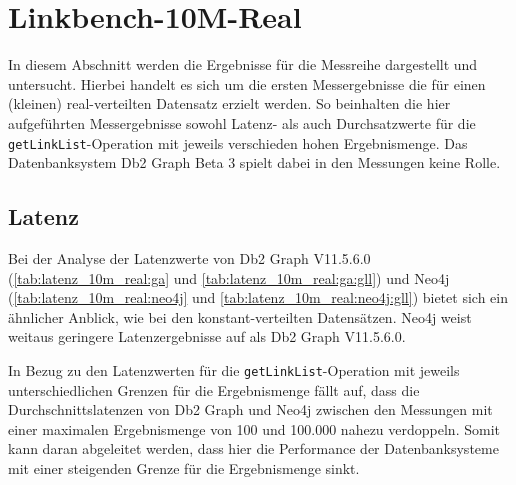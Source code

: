 \section{Linkbench-10M-Real}
\label{ergebnisse:10m_real}
In diesem Abschnitt werden die Ergebnisse für die Messreihe  dargestellt und untersucht. Hierbei handelt es sich um die ersten Messergebnisse die für einen (kleinen) real-verteilten Datensatz erzielt werden. So beinhalten die hier aufgeführten Messergebnisse sowohl Latenz- als auch Durchsatzwerte für die \texttt{getLinkList}-Operation mit jeweils verschieden hohen Ergebnismenge. Das Datenbanksystem Db2 Graph Beta 3 spielt dabei in den Messungen keine Rolle.

\subsection{Latenz}
Bei der Analyse der Latenzwerte von Db2 Graph V11.5.6.0 (\autoref{tab:latenz_10m_real:ga} und \autoref{tab:latenz_10m_real:ga:gll}) und Neo4j (\autoref{tab:latenz_10m_real:neo4j} und \autoref{tab:latenz_10m_real:neo4j:gll}) bietet sich ein ähnlicher Anblick, wie bei den konstant-verteilten Datensätzen. Neo4j weist weitaus geringere Latenzergebnisse auf als Db2 Graph V11.5.6.0. 

In Bezug zu den Latenzwerten für die \texttt{getLinkList}-Operation mit jeweils unterschiedlichen Grenzen für die Ergebnismenge fällt auf, dass die Durchschnittslatenzen von Db2 Graph und Neo4j zwischen den Messungen mit einer maximalen Ergebnismenge von 100 und 100.000 nahezu verdoppeln. Somit kann daran abgeleitet werden, dass hier die Performance der Datenbanksysteme mit einer steigenden Grenze für die Ergebnismenge sinkt.

\begin{table}[!ht]
\centering
{}
\caption{Latenz Linkbench-10M-Real Db2 Graph V11.5.6.0}
\label{tab:latenz_10m_real:ga}
\end{table}    


